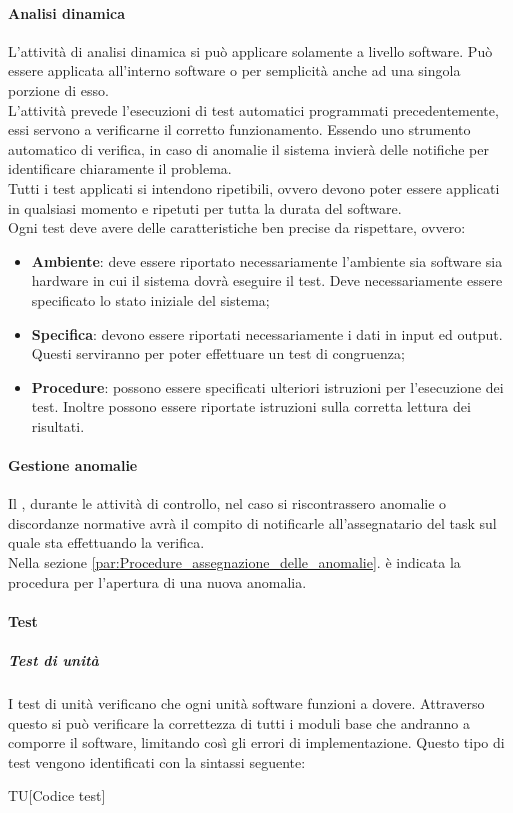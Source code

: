 			\paragraph{Analisi dinamica} %
			\label{par:analisi_dinamica}
			L'attività di analisi dinamica si può applicare solamente a livello software. Può essere applicata all'interno software o per semplicità anche ad una singola porzione di esso.\\
			L'attività prevede l'esecuzioni di test automatici programmati precedentemente, essi servono a verificarne il corretto funzionamento. Essendo uno strumento automatico di verifica, in caso di anomalie il sistema invierà delle notifiche per identificare chiaramente il problema.\\
			Tutti i test applicati si intendono ripetibili, ovvero devono poter essere applicati in qualsiasi momento e ripetuti per tutta la durata del software.\\
			Ogni test deve avere delle caratteristiche ben precise da rispettare, ovvero:
			\begin{itemize}
				\item \textbf{Ambiente}: deve essere riportato necessariamente l'ambiente sia software sia hardware in cui il sistema dovrà eseguire il test. Deve necessariamente essere specificato lo stato iniziale del sistema;
				\item \textbf{Specifica}: devono essere riportati necessariamente i dati in input ed output. Questi serviranno per poter effettuare un test di congruenza;
				\item \textbf{Procedure}: possono essere specificati ulteriori istruzioni per l'esecuzione dei test. Inoltre possono essere riportate istruzioni sulla corretta lettura dei risultati.
			\end{itemize}

			\paragraph{Gestione anomalie}
			Il \roleVerifier, durante le attività di controllo, nel caso si riscontrassero anomalie o discordanze normative avrà il compito di notificarle all'assegnatario del task sul quale sta effettuando la verifica.\\
			Nella sezione \ref{par:Procedure_assegnazione_delle_anomalie}. è indicata la procedura per l'apertura di una nuova anomalia.

			\paragraph{Test} %
			\label{par:test}
				\subparagraph{Test di unità}
				I test di unità verificano che ogni unità software funzioni a dovere. Attraverso questo si può verificare la correttezza di tutti i moduli base che andranno a comporre il software, limitando così gli errori di implementazione. Questo tipo di test vengono identificati con la sintassi seguente:\\
				 \begin{center}
				 	TU[Codice test]
				 \end{center}

